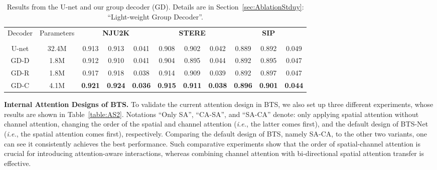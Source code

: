 \documentclass{article}
\begin{document}
\begin{table}[t]
	\centering
	\caption{Results from the U-net and our group decoder (GD). Details are in Section~\ref{sec:AblationStduy}: ``Light-weight Group Decoder''.}\vspace{-0.2cm}
	\label{table:AS3}
	\vspace{8pt}
	\footnotesize
\renewcommand{\tabcolsep}{0.18mm}
	\begin{tabular}{c|c|ccc|ccc|ccc}
		\hline\toprule
		\multirow{2}{*}{Decoder}
		&\multirow{2}{*}{Parameters} &\multicolumn{3}{c|}{\textbf{NJU2K}}  &\multicolumn{3}{c|}{\textbf{STERE}}
		&\multicolumn{3}{c}{\textbf{SIP}} \\
		&
		&
		& 
		& 
	    &
	    & 
		& 
		&
		& 
		& 
		




\\
		\midrule
		 U-net  &32.4M&0.913	&0.913	&0.041	&0.908	&0.902	&0.042		&0.889	&0.892	&0.049
 \\
		GD-D 	&1.8M&0.912	&0.910	&0.041	&0.904	&0.895	&0.044	&0.892	&0.895	&0.047

  \\	GD-R	&1.8M&0.917	&0.918	&0.038	&0.914	&0.909	&0.039	&0.892	&0.897	&0.047

  \\	GD-C   &4.1M &\bf{0.921} &\bf{0.924}	&\bf{0.036}	 &\bf{0.915}	&\bf{0.911}	&\bf{0.038}	&\bf{0.896}	&\bf{0.901}	&\bf{0.044}
  \\
		\bottomrule
		\hline
	\end{tabular}
	\vspace{-8pt}
\end{table}

\textbf{Internal Attention Designs of BTS.} To validate the current attention design in BTS, we also set up three different experiments, whose results are shown in Table~\ref{table:AS2}. Notations ``Only SA'', ``CA-SA'', and ``SA-CA'' denote: only applying spatial attention without channel attention, changing the order of the spatial and channel attention (\emph{i.e.}, the latter comes first), and the default design of BTS-Net (\emph{i.e.}, the spatial attention comes first), respectively. Comparing the default design of BTS, namely SA-CA, to the other two variants, one can see it consistently achieves the best performance. Such comparative experiments show that the order of spatial-channel attention is crucial for introducing attention-aware interactions, whereas combining channel attention with bi-directional spatial attention transfer is effective. 
\end{document}
